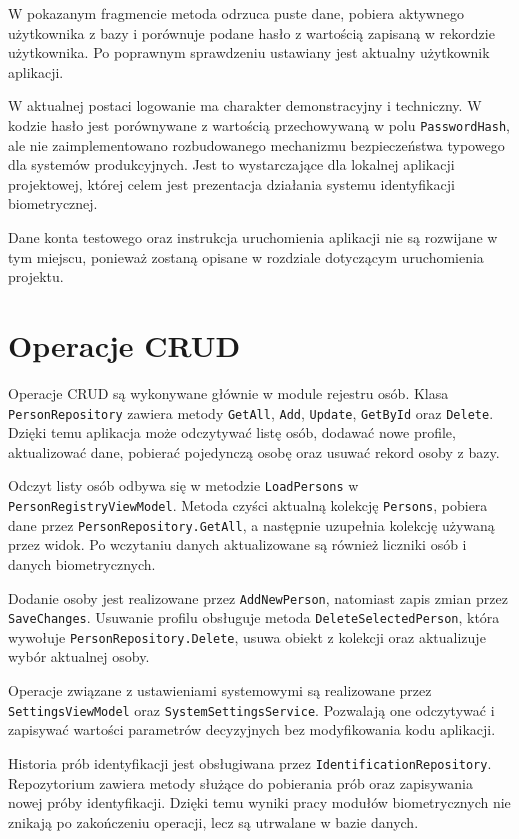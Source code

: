 W pokazanym fragmencie metoda odrzuca puste dane, pobiera aktywnego użytkownika z bazy i porównuje podane hasło z wartością zapisaną w rekordzie użytkownika. Po poprawnym sprawdzeniu ustawiany jest aktualny użytkownik aplikacji.

W aktualnej postaci logowanie ma charakter demonstracyjny i techniczny. W kodzie hasło jest porównywane z wartością przechowywaną w polu \texttt{PasswordHash}, ale nie zaimplementowano rozbudowanego mechanizmu bezpieczeństwa typowego dla systemów produkcyjnych. Jest to wystarczające dla lokalnej aplikacji projektowej, której celem jest prezentacja działania systemu identyfikacji biometrycznej.

Dane konta testowego oraz instrukcja uruchomienia aplikacji nie są rozwijane w tym miejscu, ponieważ zostaną opisane w rozdziale dotyczącym uruchomienia projektu.

\section{Operacje CRUD}

Operacje CRUD są wykonywane głównie w module rejestru osób. Klasa \texttt{PersonRepository} zawiera metody \texttt{GetAll}, \texttt{Add}, \texttt{Update}, \texttt{GetById} oraz \texttt{Delete}. Dzięki temu aplikacja może odczytywać listę osób, dodawać nowe profile, aktualizować dane, pobierać pojedynczą osobę oraz usuwać rekord osoby z bazy.

Odczyt listy osób odbywa się w metodzie \texttt{LoadPersons} w \texttt{PersonRegistryViewModel}. Metoda czyści aktualną kolekcję \texttt{Persons}, pobiera dane przez \texttt{PersonRepository.GetAll}, a następnie uzupełnia kolekcję używaną przez widok. Po wczytaniu danych aktualizowane są również liczniki osób i danych biometrycznych.

Dodanie osoby jest realizowane przez \texttt{AddNewPerson}, natomiast zapis zmian przez \texttt{SaveChanges}. Usuwanie profilu obsługuje metoda \texttt{DeleteSelectedPerson}, która wywołuje \texttt{PersonRepository.Delete}, usuwa obiekt z kolekcji oraz aktualizuje wybór aktualnej osoby.

Operacje związane z ustawieniami systemowymi są realizowane przez \texttt{SettingsViewModel} oraz \texttt{SystemSettingsService}. Pozwalają one odczytywać i zapisywać wartości parametrów decyzyjnych bez modyfikowania kodu aplikacji.

Historia prób identyfikacji jest obsługiwana przez \texttt{IdentificationRepository}. Repozytorium zawiera metody służące do pobierania prób oraz zapisywania nowej próby identyfikacji. Dzięki temu wyniki pracy modułów biometrycznych nie znikają po zakończeniu operacji, lecz są utrwalane w bazie danych.

